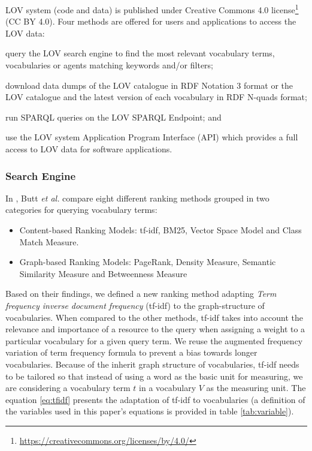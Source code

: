 \documentclass{iosart2c}
\begin{document}
LOV system (code and data) is published under Creative Commons 4.0 license\footnote{\url{https://creativecommons.org/licenses/by/4.0/}} (CC BY 4.0). Four methods are offered for users and applications to access the LOV data:
		\begin{inparaenum}[1)] 
			\item query the LOV search engine to find the most relevant vocabulary terms, vocabularies or agents matching keywords and/or filters;
			\item download data dumps of the LOV catalogue in RDF Notation 3 format or the LOV catalogue and the latest version of each vocabulary in RDF N-quads format;
			\item run SPARQL queries on the LOV SPARQL Endpoint; and
			\item use the LOV system Application Program Interface (API) which provides a full access to LOV data for software applications.
		\end{inparaenum}


\subsubsection{Search Engine}\label{sssec:search}
In \cite{butt2014}, Butt \emph{et al.} compare eight different ranking methods grouped in two categories for querying vocabulary terms:
\begin{itemize}
	\item Content-based Ranking Models: tf-idf, BM25, Vector Space Model and Class Match Measure.
	\item Graph-based Ranking Models: PageRank, Density Measure, Semantic Similarity Measure and Betweenness Measure
\end{itemize}
Based on their findings, we defined a new ranking method adapting \emph{Term frequency inverse document frequency} (tf-idf) to the graph-structure of vocabularies. When compared to the other methods, tf-idf takes into account the relevance and importance of a resource to the query when assigning a weight to a particular vocabulary for a given query term. We reuse the augmented frequency variation of term frequency formula to prevent a bias towards longer vocabularies. Because of the inherit graph structure of vocabularies, tf-idf needs to be tailored so that instead of using a word as the basic unit for measuring, we are considering a vocabulary term $t$ in a vocabulary $V$ as the measuring unit. The equation \ref{eq:tfidf} presents the adaptation of tf-idf to vocabularies (a definition of the variables used in this paper's equations is provided in table \ref{tab:variable}). 
\end{document}
